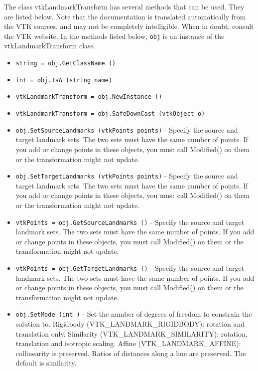 The class vtkLandmarkTransform has several methods that can be used.
  They are listed below.
Note that the documentation is translated automatically from the VTK sources,
and may not be completely intelligible.  When in doubt, consult the VTK website.
In the methods listed below, \verb|obj| is an instance of the vtkLandmarkTransform class.
\begin{itemize}
\item  \verb|string = obj.GetClassName ()|

\item  \verb|int = obj.IsA (string name)|

\item  \verb|vtkLandmarkTransform = obj.NewInstance ()|

\item  \verb|vtkLandmarkTransform = obj.SafeDownCast (vtkObject o)|

\item  \verb|obj.SetSourceLandmarks (vtkPoints points)| -  Specify the source and target landmark sets. The two sets must have 
 the same number of points.  If you add or change points in these objects,
 you must call Modified() on them or the transformation might not update.

\item  \verb|obj.SetTargetLandmarks (vtkPoints points)| -  Specify the source and target landmark sets. The two sets must have 
 the same number of points.  If you add or change points in these objects,
 you must call Modified() on them or the transformation might not update.

\item  \verb|vtkPoints = obj.GetSourceLandmarks ()| -  Specify the source and target landmark sets. The two sets must have 
 the same number of points.  If you add or change points in these objects,
 you must call Modified() on them or the transformation might not update.

\item  \verb|vtkPoints = obj.GetTargetLandmarks ()| -  Specify the source and target landmark sets. The two sets must have 
 the same number of points.  If you add or change points in these objects,
 you must call Modified() on them or the transformation might not update.

\item  \verb|obj.SetMode (int )| -  Set the number of degrees of freedom to constrain the solution to.
 Rigidbody (VTK\_LANDMARK\_RIGIDBODY): rotation and translation only.  
 Similarity (VTK\_LANDMARK\_SIMILARITY): rotation, translation and 
            isotropic scaling.
 Affine (VTK\_LANDMARK\_AFFINE): collinearity is preserved. 
        Ratios of distances along a line are preserved.
 The default is similarity.


\end{itemize}
